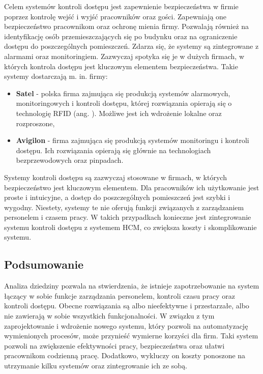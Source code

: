 Celem systemów kontroli dostępu jest zapewnienie bezpieczeństwa w firmie poprzez kontrolę wejść i wyjść pracowników oraz gości. Zapewniają one bezpieczeństwo pracownikom oraz ochronę mienia firmy. Pozwalają również na identyfikację osób przemieszczających się po budynku oraz na ograniczenie dostępu do poszczególnych pomieszczeń. Zdarza się, że systemy są zintegrowane z alarmami oraz monitoringiem. Zazwyczaj spotyka się je w dużych firmach, w których kontrola dostępu jest kluczowym elementem bezpieczeństwa. Takie systemy dostarczają m. in. firmy:

\begin{itemize}
    \item \textbf{Satel} - polska firma zajmująca się produkcją systemów alarmowych, monitoringowych i kontroli dostępu, której rozwiązania opierają się o technologię RFID (ang. ). Możliwe jest ich wdrożenie lokalne oraz rozproszone,
    \item \textbf{Avigilon} - firma zajmująca się produkcją systemów monitoringu i kontroli dostępu. Ich rozwiązania opierają się głównie na technologiach bezprzewodowych oraz pinpadach.
\end{itemize}

Systemy kontroli dostępu są zazwyczaj stosowane w firmach, w których bezpieczeństwo jest kluczowym elementem. Dla pracowników ich użytkowanie jest proste i intuicyjne, a dostęp do poszczególnych pomieszczeń jest szybki i wygodny. Niestety, systemy te nie oferują funkcji związanych z zarządzaniem personelem i czasem pracy. W takich przypadkach konieczne jest zintegrowanie systemu kontroli dostępu z systemem HCM, co zwiększa koszty i skomplikowanie systemu.

\subsection{Podsumowanie}

Analiza dziedziny pozwala na stwierdzenia, że istnieje zapotrzebowanie na system łączący w sobie funkcje zarządzania personelem, kontroli czasu pracy oraz kontroli dostępu. Obecne rozwiązania są albo nieefektywne i przestarzałe, albo nie zawierają w sobie wszystkich funkcjonalności. W związku z tym zaprojektowanie i wdrożenie nowego systemu, który pozwoli na automatyzację wymienionych procesów, może przynieść wymierne korzyści dla firm. Taki system pozwoli na zwiększenie efektywności pracy, bezpieczeństwa oraz ułatwi pracownikom codzienną pracę. Dodatkowo, wykluczy on koszty ponoszone na utrzymanie kilku systemów oraz zintegrowanie ich ze sobą.

